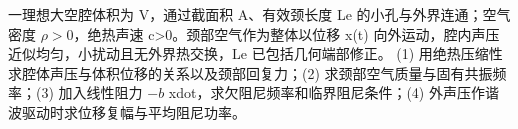 一理想大空腔体积为 V，通过截面积 A、有效颈长度 Le 的小孔与外界连通；空气密度 \(\rho >0\)，绝热声速 c>0。颈部空气作为整体以位移 x(t) 向外运动，腔内声压近似均匀，小扰动且无外界热交换，Le 已包括几何端部修正。
(1) 用绝热压缩性求腔体声压与体积位移的关系以及颈部回复力；(2) 求颈部空气质量与固有共振频率；(3) 加入线性阻力 \(-b\) xdot，求欠阻尼频率和临界阻尼条件；(4) 外声压作谐波驱动时求位移复幅与平均阻尼功率。
